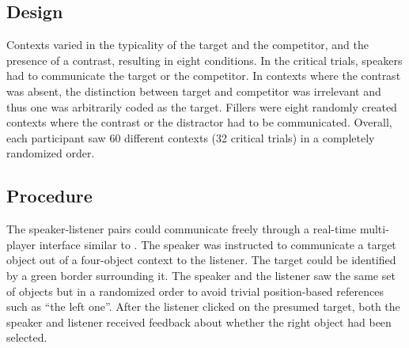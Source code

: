 \documentclass[10pt,letterpaper]{article}
\begin{document}


\subsection{Design}
Contexts varied in the typicality of the target and the competitor, and the presence of a contrast, resulting in eight conditions. In the critical trials, speakers had to communicate the target or the competitor. In contexts where the contrast was absent, the distinction between target and competitor was irrelevant and thus one was arbitrarily coded as the target. Fillers were eight randomly created contexts where the contrast or the distractor had to be communicated.
Overall, each participant saw 60 different contexts (32 critical trials) in a completely randomized order.



\subsection{Procedure}
The speaker-listener pairs could communicate freely through a real-time multi-player interface similar to \cite{Hawkins:2015}. The speaker was instructed to communicate a target object out of a four-object context to the listener. The target could be identified by a green border surrounding it. The speaker and the listener saw the same set of objects but in a randomized order to avoid trivial position-based references such as ``the left one''. After the listener clicked on the presumed target, both the speaker and listener received feedback about whether the right object had been selected.
\end{document}
